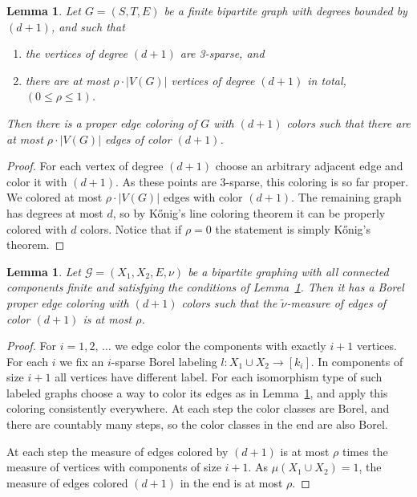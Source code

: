 \documentclass[11pt]{article}
\newtheorem{lemm}[theo]{Lemma}
\theoremstyle{definition}
\numberwithin{equation}{section}
\numberwithin{figure}{section}
\numberwithin{table}{section}
\newcommand{\G}{\mathcal{G}}
\begin{document}
\begin{lemm}\label{lemma:finite_smart_coloring}
Let $G=(S,T,E)$ be a finite bipartite graph with degrees bounded by $(d+1)$, and such that
\begin{enumerate}
\item \label{condition:bad_points_sparse}
the vertices of degree $(d+1)$ are 3-sparse, and
\item there are at most $\rho \cdot |V(G)|$ vertices of degree $(d+1)$ in total, $(0 \leq \rho \leq 1)$.
\end{enumerate}
Then there is a proper edge coloring of $G$ with $(d+1)$ colors such that there are at most $\rho \cdot |V(G)|$ edges of color $(d+1)$.
\end{lemm}

\begin{proof}
For each vertex of degree $(d+1)$ choose an arbitrary adjacent edge and color it with $(d+1)$. As these points are 3-sparse, this coloring is so far proper. We colored at most $\rho \cdot |V(G)|$ edges with color $(d+1)$. The remaining graph has degrees at most $d$, so by Kőnig's line coloring theorem it can be properly colored with $d$ colors. Notice that if $\rho=0$ the statement is simply Kőnig's theorem.
\end{proof}


\begin{lemm}\label{lemma:finite_components_smart_coloring}
Let $\G=(X_1,X_2,E, \nu)$ be a bipartite graphing with all connected components finite and satisfying the conditions of Lemma~\ref{lemma:finite_smart_coloring}. Then it has a Borel proper edge coloring with $(d+1)$ colors such that the $\widetilde{\nu}$-measure of edges of color $(d+1)$ is at most $\rho$.
\end{lemm}

\begin{proof}
For $i=1,2,\,\dots$ we edge color the components with exactly $i+1$ vertices. For each $i$ we fix an $i$-sparse Borel labeling $l: X_1 \cup X_2 \to [k_i]$. In components of size $i+1$ all vertices have different label. For each isomorphism type of such labeled graphs choose a way to color its edges as in Lemma~\ref{lemma:finite_smart_coloring}, and apply this coloring consistently everywhere. At each step the color classes are Borel, and there are countably many steps, so the color classes in the end are also Borel.

At each step the measure of edges colored by $(d+1)$ is at most $\rho$ times the measure of vertices with components of size $i+1$. As $\mu(X_1 \cup X_2) = 1$, the measure of edges colored $(d+1)$ in the end is at most $\rho$.
\end{proof}
\end{document}
